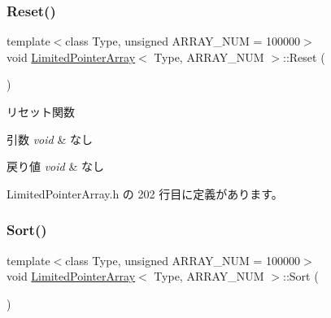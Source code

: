 \mbox{\label{class_limited_pointer_array_a762f1dd92e84cdd1fedbc0e45d72fc3c}} 
\subsubsection{\texorpdfstring{Reset()}{Reset()}}
{\footnotesize\ttfamily template$<$class Type, unsigned A\+R\+R\+A\+Y\+\_\+\+N\+UM = 100000$>$ \\
void \mbox{\hyperlink{class_limited_pointer_array}{Limited\+Pointer\+Array}}$<$ Type, A\+R\+R\+A\+Y\+\_\+\+N\+UM $>$\+::Reset (\begin{DoxyParamCaption}{ }\end{DoxyParamCaption})\hspace{0.3cm}{\ttfamily [inline]}}



リセット関数 


\begin{DoxyParams}{引数}
{\em void} & なし \\
\hline
\end{DoxyParams}

\begin{DoxyRetVals}{戻り値}
{\em void} & なし \\
\hline
\end{DoxyRetVals}


 Limited\+Pointer\+Array.\+h の 202 行目に定義があります。

\mbox{\label{class_limited_pointer_array_ab74449f9eacc2e3df53ab35678f680c5}} 
\subsubsection{\texorpdfstring{Sort()}{Sort()}}
{\footnotesize\ttfamily template$<$class Type, unsigned A\+R\+R\+A\+Y\+\_\+\+N\+UM = 100000$>$ \\
void \mbox{\hyperlink{class_limited_pointer_array}{Limited\+Pointer\+Array}}$<$ Type, A\+R\+R\+A\+Y\+\_\+\+N\+UM $>$\+::Sort (\begin{DoxyParamCaption}{ }\end{DoxyParamCaption})\hspace{0.3cm}{\ttfamily [inline]}}




